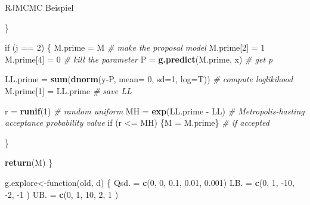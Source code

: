 \documentclass[ignorenonframetext,]{beamer}
\newenvironment{Shaded}{\begin{snugshade}}{\end{snugshade}}
\newcommand{\KeywordTok}[1]{\textcolor[rgb]{0.13,0.29,0.53}{\textbf{{#1}}}}
\newcommand{\DataTypeTok}[1]{\textcolor[rgb]{0.13,0.29,0.53}{{#1}}}
\newcommand{\DecValTok}[1]{\textcolor[rgb]{0.00,0.00,0.81}{{#1}}}
\newcommand{\FloatTok}[1]{\textcolor[rgb]{0.00,0.00,0.81}{{#1}}}
\newcommand{\StringTok}[1]{\textcolor[rgb]{0.31,0.60,0.02}{{#1}}}
\newcommand{\CommentTok}[1]{\textcolor[rgb]{0.56,0.35,0.01}{\textit{{#1}}}}
\newcommand{\NormalTok}[1]{{#1}}
\begin{document}
\begin{frame}{RJMCMC Beispiel}
\begin{Shaded}
\begin{Highlighting}[]
\NormalTok{\}}

\NormalTok{if (j ==}\StringTok{ }\DecValTok{2}\NormalTok{)}
\NormalTok{\{}
\NormalTok{M.prime =}\StringTok{ }\NormalTok{M                                           }\CommentTok{# make the proposal model}
\NormalTok{M.prime[}\DecValTok{2}\NormalTok{] =}\StringTok{ }\DecValTok{1}
\NormalTok{M.prime[}\DecValTok{4}\NormalTok{] =}\StringTok{ }\DecValTok{0}                                        \CommentTok{# kill the parameter}
\NormalTok{P =}\StringTok{ }\KeywordTok{g.predict}\NormalTok{(M.prime, x)                             }\CommentTok{# get p}

\NormalTok{LL.prime =}\StringTok{ }\KeywordTok{sum}\NormalTok{(}\KeywordTok{dnorm}\NormalTok{(y-P, }\DataTypeTok{mean=} \DecValTok{0}\NormalTok{, }\DataTypeTok{sd=}\DecValTok{1}\NormalTok{, }\DataTypeTok{log=}\NormalTok{T))      }\CommentTok{# compute loglikihood}
\NormalTok{M.prime[}\DecValTok{1}\NormalTok{] =}\StringTok{ }\NormalTok{LL.prime                                 }\CommentTok{# save LL}

\NormalTok{r =}\StringTok{ }\KeywordTok{runif}\NormalTok{(}\DecValTok{1}\NormalTok{)                                          }\CommentTok{# random uniform}
\NormalTok{MH =}\StringTok{ }\KeywordTok{exp}\NormalTok{(LL.prime -}\StringTok{ }\NormalTok{LL)                               }\CommentTok{# Metropolis-hasting acceptance probability value}
\NormalTok{if (r <=}\StringTok{ }\NormalTok{MH) \{M =}\StringTok{ }\NormalTok{M.prime\}                            }\CommentTok{# if accepted}

\NormalTok{\}}

\KeywordTok{return}\NormalTok{(M)}
\NormalTok{\}}
\end{Highlighting}
\end{Shaded}

\begin{Shaded}
\begin{Highlighting}[]
\NormalTok{g.explore<-function(old, d)}
\NormalTok{\{}
\NormalTok{Qsd. =}\StringTok{ }\KeywordTok{c}\NormalTok{(}\DecValTok{0}\NormalTok{, }\DecValTok{0}\NormalTok{, }\FloatTok{0.1}\NormalTok{, }\FloatTok{0.01}\NormalTok{, }\FloatTok{0.001}\NormalTok{)}
\NormalTok{LB.  =}\StringTok{ }\KeywordTok{c}\NormalTok{(}\DecValTok{0}\NormalTok{, }\DecValTok{1}\NormalTok{, -}\DecValTok{10}\NormalTok{, -}\DecValTok{2}\NormalTok{, -}\DecValTok{1} \NormalTok{)}
\NormalTok{UB.  =}\StringTok{ }\KeywordTok{c}\NormalTok{(}\DecValTok{0}\NormalTok{, }\DecValTok{1}\NormalTok{, }\DecValTok{10}\NormalTok{, }\DecValTok{2}\NormalTok{, }\DecValTok{1} \NormalTok{)}


\end{Highlighting}
\end{Shaded}
\end{frame}
\end{document}
